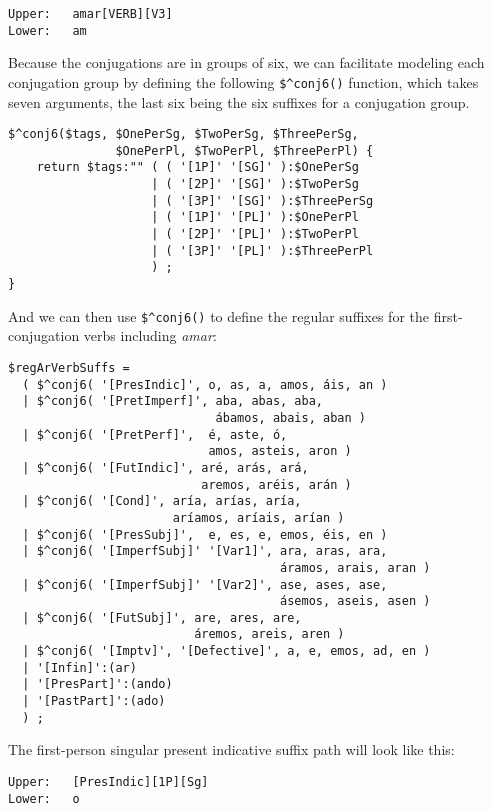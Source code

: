 \begin{Verbatim}
Upper:   amar[VERB][V3]
Lower:   am
\end{Verbatim}

Because the conjugations are in groups of six, we can facilitate modeling each
conjugation group by defining the following \verb!$^conj6()! function, which takes seven
arguments, the last six being the six suffixes for a conjugation group.

\begin{Verbatim}
$^conj6($tags, $OnePerSg, $TwoPerSg, $ThreePerSg,
               $OnePerPl, $TwoPerPl, $ThreePerPl) {
    return $tags:"" ( ( '[1P]' '[SG]' ):$OnePerSg
                    | ( '[2P]' '[SG]' ):$TwoPerSg
                    | ( '[3P]' '[SG]' ):$ThreePerSg
                    | ( '[1P]' '[PL]' ):$OnePerPl
                    | ( '[2P]' '[PL]' ):$TwoPerPl
                    | ( '[3P]' '[PL]' ):$ThreePerPl
                    ) ;
}
\end{Verbatim}

\noindent
And we can then use \verb!$^conj6()! to define the regular suffixes for the first-conjugation
verbs including \emph{amar}:

\begin{Verbatim}
$regArVerbSuffs = 		
  ( $^conj6( '[PresIndic]', o, as, a, amos, áis, an )
  | $^conj6( '[PretImperf]', aba, abas, aba,
                             ábamos, abais, aban )
  | $^conj6( '[PretPerf]',  é, aste, ó, 
                            amos, asteis, aron )
  | $^conj6( '[FutIndic]', aré, arás, ará, 
                           aremos, aréis, arán )
  | $^conj6( '[Cond]', aría, arías, aría, 
                       aríamos, aríais, arían )
  | $^conj6( '[PresSubj]',  e, es, e, emos, éis, en ) 
  | $^conj6( '[ImperfSubj]' '[Var1]', ara, aras, ara, 
                                      áramos, arais, aran )
  | $^conj6( '[ImperfSubj]' '[Var2]', ase, ases, ase, 
                                      ásemos, aseis, asen )
  | $^conj6( '[FutSubj]', are, ares, are, 
                          áremos, areis, aren )
  | $^conj6( '[Imptv]', '[Defective]', a, e, emos, ad, en )
  | '[Infin]':(ar)
  | '[PresPart]':(ando)
  | '[PastPart]':(ado)
  ) ;
\end{Verbatim}

The first-person singular present indicative suffix path will look like this:

\begin{Verbatim}
Upper:   [PresIndic][1P][Sg]
Lower:   o
\end{Verbatim}

